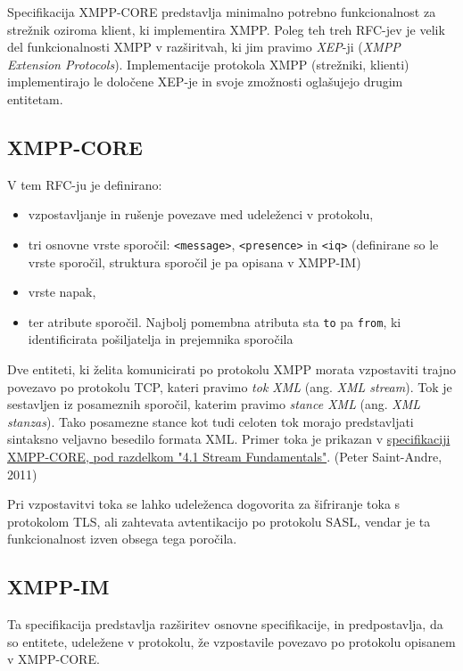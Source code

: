 \documentclass[11pt]{article}
\begin{document}
Specifikacija XMPP-CORE predstavlja minimalno potrebno funkcionalnost
za strežnik oziroma klient, ki implementira XMPP. Poleg teh treh
RFC-jev je velik del funkcionalnosti XMPP v razširitvah, ki jim
pravimo \emph{XEP}-ji (\emph{XMPP Extension Protocols}). Implementacije
protokola XMPP (strežniki, klienti) implementirajo le določene XEP-je
in svoje zmožnosti oglašujejo drugim entitetam.

\subsection{XMPP-CORE}
\label{sec:org59676f3}

V tem RFC-ju je definirano:

\begin{itemize}
\item vzpostavljanje in rušenje povezave med udeleženci v protokolu,
\item tri osnovne vrste sporočil: \texttt{<message>}, \texttt{<presence>} in \texttt{<iq>}
(definirane so le vrste sporočil, struktura sporočil je pa opisana v
XMPP-IM)
\item vrste napak,
\item ter atribute sporočil. Najbolj pomembna atributa sta \texttt{to} pa \texttt{from},
ki identificirata pošiljatelja in prejemnika sporočila
\end{itemize}

Dve entiteti, ki želita komunicirati po protokolu XMPP morata
vzpostaviti trajno povezavo po protokolu TCP, kateri pravimo \emph{tok XML}
(ang. \emph{XML stream}). Tok je sestavljen iz posameznih sporočil, katerim
pravimo \emph{stance XML} (ang. \emph{XML stanzas}). Tako posamezne stance kot
tudi celoten tok morajo predstavljati sintaksno veljavno besedilo
formata XML. Primer toka je prikazan v \href{https://xmpp.org/rfcs/rfc6120.html\#streams-fundamentals}{specifikaciji XMPP-CORE, pod
razdelkom "4.1 Stream Fundamentals"}. (Peter Saint-Andre, 2011)

Pri vzpostavitvi toka se lahko udeleženca dogovorita za šifriranje
toka s protokolom TLS, ali zahtevata avtentikacijo po protokolu SASL,
vendar je ta funkcionalnost izven obsega tega poročila.

\subsection{XMPP-IM}
\label{sec:org93ca5d0}

Ta specifikacija predstavlja razširitev osnovne specifikacije, in
predpostavlja, da so entitete, udeležene v protokolu, že vzpostavile
povezavo po protokolu opisanem v XMPP-CORE.
\end{document}
